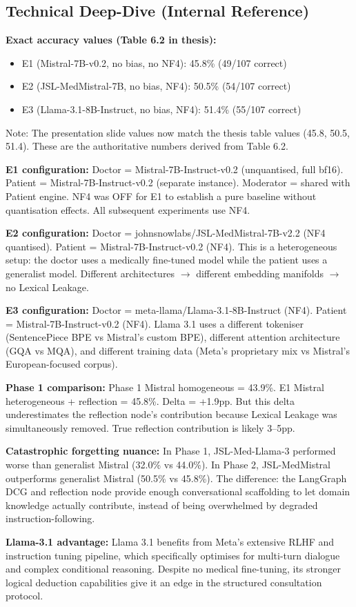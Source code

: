 \documentclass[12pt]{article}
\begin{document}
  \subsection*{Technical Deep-Dive (Internal Reference)}
  {\color{techgray}
  \textbf{Exact accuracy values (Table 6.2 in thesis):}
  \begin{itemize}
    \item E1 (Mistral-7B-v0.2, no bias, no NF4): 45.8\% (49/107 correct)
    \item E2 (JSL-MedMistral-7B, no bias, NF4): 50.5\% (54/107 correct)
    \item E3 (Llama-3.1-8B-Instruct, no bias, NF4): 51.4\% (55/107 correct)
  \end{itemize}
  Note: The presentation slide values now match the thesis table values (45.8, 50.5, 51.4). These are the authoritative numbers derived from Table 6.2.

  \textbf{E1 configuration:} Doctor = Mistral-7B-Instruct-v0.2 (unquantised, full bf16). Patient = Mistral-7B-Instruct-v0.2 (separate instance). Moderator = shared with Patient engine. NF4 was OFF for E1 to establish a pure baseline without quantisation effects. All subsequent experiments use NF4.

  \textbf{E2 configuration:} Doctor = johnsnowlabs/JSL-MedMistral-7B-v2.2 (NF4 quantised). Patient = Mistral-7B-Instruct-v0.2 (NF4). This is a heterogeneous setup: the doctor uses a medically fine-tuned model while the patient uses a generalist model. Different architectures $\to$ different embedding manifolds $\to$ no Lexical Leakage.

  \textbf{E3 configuration:} Doctor = meta-llama/Llama-3.1-8B-Instruct (NF4). Patient = Mistral-7B-Instruct-v0.2 (NF4). Llama 3.1 uses a different tokeniser (SentencePiece BPE vs Mistral's custom BPE), different attention architecture (GQA vs MQA), and different training data (Meta's proprietary mix vs Mistral's European-focused corpus).

  \textbf{Phase 1 comparison:} Phase 1 Mistral homogeneous = 43.9\%. E1 Mistral heterogeneous + reflection = 45.8\%. Delta = +1.9pp. But this delta underestimates the reflection node's contribution because Lexical Leakage was simultaneously removed. True reflection contribution is likely 3--5pp.

  \textbf{Catastrophic forgetting nuance:} In Phase 1, JSL-Med-Llama-3 performed worse than generalist Mistral (32.0\% vs 44.0\%). In Phase 2, JSL-MedMistral outperforms generalist Mistral (50.5\% vs 45.8\%). The difference: the LangGraph DCG and reflection node provide enough conversational scaffolding to let domain knowledge actually contribute, instead of being overwhelmed by degraded instruction-following.

  \textbf{Llama-3.1 advantage:} Llama 3.1 benefits from Meta's extensive RLHF and instruction tuning pipeline, which specifically optimises for multi-turn dialogue and complex conditional reasoning. Despite no medical fine-tuning, its stronger logical deduction capabilities give it an edge in the structured consultation protocol.
  }
\end{document}
